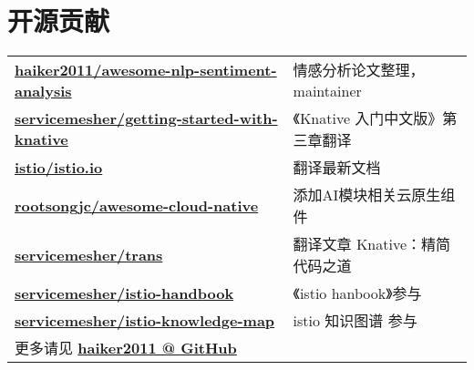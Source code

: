 \documentclass[]{deedy-resume-openfont}
\begin{document}
\begin{minipage}[t]{0.68\textwidth}




\section{开源贡献}
\begin{tabular}{ll}
\href{https://github.com/haiker2011/awesome-nlp-sentiment-analysis/commits?author=haiker2011}{\bf haiker2011/awesome-nlp-sentiment-analysis} & 情感分析论文整理，maintainer \\
\href{https://github.com/servicemesher/getting-started-with-knative/commits?author=haiker2011}{\bf servicemesher/getting-started-with-knative} & 《Knative 入门中文版》第三章翻译 \\
\href{https://github.com/istio/istio.io/pull/3798}{\bf istio/istio.io} & 翻译最新文档  \\
\href{https://github.com/rootsongjc/awesome-cloud-native/commits?author=haiker2011}{\bf rootsongjc/awesome-cloud-native} & 添加AI模块相关云原生组件 \\
\href{https://github.com/servicemesher/trans/commits?author=haiker2011}{\bf servicemesher/trans} & 翻译文章 Knative：精简代码之道 \\
\href{https://github.com/servicemesher/istio-handbook/commits?author=haiker2011}{\bf servicemesher/istio-handbook} & 《istio hanbook》参与 \\
\href{https://github.com/servicemesher/istio-knowledge-map/commits?author=haiker2011}{\bf servicemesher/istio-knowledge-map} & istio 知识图谱 参与 \\
更多请见 \href{https://github.com/haiker2011}{\bf haiker2011 @ GitHub} & \\
\end{tabular}
\sectionsep


\end{minipage} 
\end{document}
